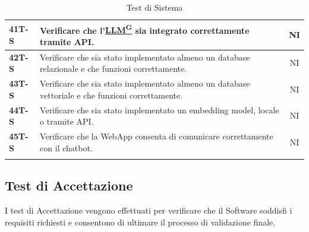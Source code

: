 \documentclass{article}
\begin{document}
\begin{longtable}{|>{\centering\arraybackslash}m{}|>{\raggedright\arraybackslash}m{}|c|}
    \textbf{41T-S} & Verificare che l’\href{https://code7crusaders.github.io/docs/RTB/documentazione_interna/glossario.html#llm-large-language-model}{LLM\textsuperscript{G}} sia integrato correttamente tramite API. & NI \\
    \hline
    \textbf{42T-S} & Verificare che sia stato implementato almeno un database relazionale e che funzioni correttamente. & NI \\
    \hline
    \textbf{43T-S} & Verificare che sia stato implementato almeno un database vettoriale e che funzioni correttamente. & NI \\
    \hline
    \textbf{44T-S} & Verificare che sia stato implementato un embedding model, locale o tramite API. & NI \\
    \hline
    \textbf{45T-S} & Verificare che la WebApp consenta di comunicare correttamente con il chatbot. & NI \\
    \hline
\caption{Test di Sistema}
\end{longtable}



\newpage
\subsection{Test di Accettazione} %
I test di Accettazione vengono effettuati per verificare che il Software soddisfi i requisiti richiesti e consentono di ultimare il processo di validazione finale.
\end{document}
